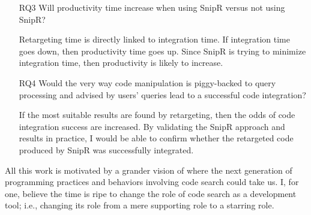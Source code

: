 \begin{itemize}
	\item[RQ3] Will productivity time increase when using SnipR versus not using SnipR?
	
	Retargeting time is directly linked to integration time. If integration time goes 
	down, then productivity time goes up. Since SnipR is trying to minimize 
	integration time, then productivity is likely to increase.
	
	\item[RQ4] Would the very way code manipulation is piggy-backed to query processing 
	and advised by users' queries lead to a successful code integration?
	
	If the most suitable results are found by retargeting, then the odds of code 
	integration success are increased. By validating the SnipR approach 
	and results in practice, I would be able to confirm whether the retargeted code 
	produced by SnipR was successfully integrated.
\end{itemize}

All this work is motivated by a grander vision of where the next generation of programming practices and behaviors involving code search could take us. I, for one, believe the time is ripe to change the role of code search as a development tool; i.e., changing its role from a mere supporting role to a starring role.